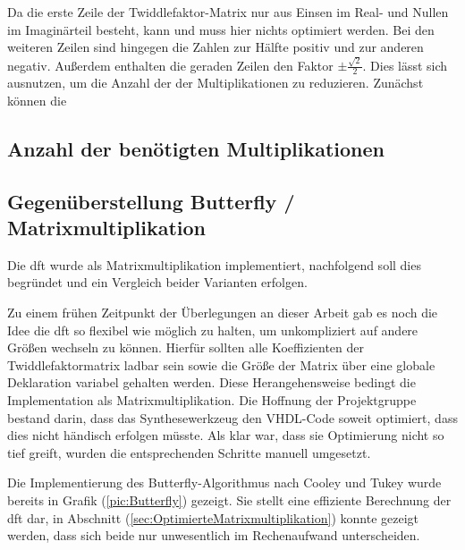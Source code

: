 Da die erste Zeile der Twiddlefaktor-Matrix nur aus Einsen im Real- und Nullen im Imaginärteil besteht, kann und muss hier nichts optimiert werden. 
Bei den weiteren Zeilen sind hingegen die Zahlen zur Hälfte positiv und zur anderen negativ. Außerdem enthalten die geraden Zeilen den Faktor $\pm\frac{\sqrt{2}}{2}$. 
Dies lässt sich ausnutzen, um die Anzahl der der Multiplikationen zu reduzieren. Zunächst können die 





\subsection{Anzahl der benötigten Multiplikationen}



\subsection{Gegenüberstellung Butterfly / Matrixmultiplikation} 
Die \gls{dft} wurde als Matrixmultiplikation implementiert, nachfolgend soll dies begründet und ein Vergleich beider Varianten erfolgen.
  
Zu einem frühen Zeitpunkt der Überlegungen 
an dieser Arbeit gab es noch die Idee die \gls{dft} so flexibel wie möglich zu halten, um unkompliziert auf andere Größen wechseln zu können.
Hierfür sollten alle Koeffizienten der Twiddlefaktormatrix ladbar sein sowie die Größe der Matrix über eine globale Deklaration variabel gehalten werden.
Diese Herangehensweise bedingt die Implementation als Matrixmultiplikation. Die Hoffnung der Projektgruppe bestand darin, dass das Synthesewerkzeug den 
VHDL-Code soweit optimiert, dass dies nicht händisch erfolgen müsste.
Als klar war, dass sie Optimierung nicht so tief greift, wurden die entsprechenden Schritte manuell umgesetzt. 
  
Die Implementierung des Butterfly-Algorithmus nach Cooley und Tukey wurde bereits in Grafik (\ref{pic:Butterfly}) gezeigt. Sie stellt eine effiziente Berechnung der \gls{dft} dar, in 
Abschnitt (\ref{sec:OptimierteMatrixmultiplikation}) konnte gezeigt werden, dass sich beide nur unwesentlich im Rechenaufwand unterscheiden.


